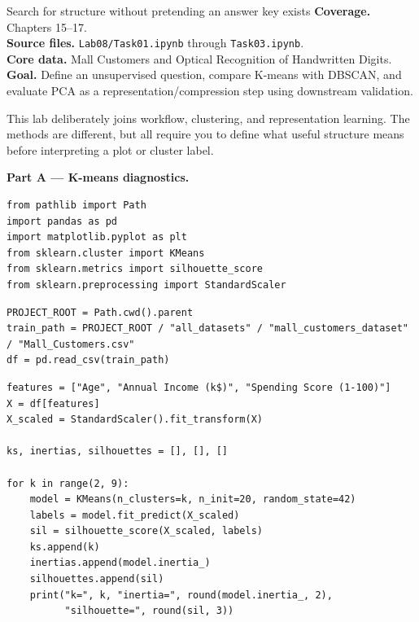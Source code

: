 
\begin{labproject}{Search for structure without pretending an answer key exists}
\textbf{Coverage.} Chapters 15--17.\\
\textbf{Source files.} \texttt{Lab08/Task01.ipynb} through \texttt{Task03.ipynb}.\\
\textbf{Core data.} Mall Customers and Optical Recognition of Handwritten Digits.\\
\textbf{Goal.} Define an unsupervised question, compare K-means with DBSCAN, and evaluate PCA as a representation/compression step using downstream validation.

\begin{labmode}
This lab deliberately joins workflow, clustering, and representation learning. The methods are different, but all require you to define what useful structure means before interpreting a plot or cluster label.
\end{labmode}

\medskip\noindent\textbf{Part A --- K-means diagnostics.}\par
\begin{lstlisting}[style=mlpython]
from pathlib import Path
import pandas as pd
import matplotlib.pyplot as plt
from sklearn.cluster import KMeans
from sklearn.metrics import silhouette_score
from sklearn.preprocessing import StandardScaler
\end{lstlisting}

\begin{lstlisting}[style=mlpython]
PROJECT_ROOT = Path.cwd().parent
train_path = PROJECT_ROOT / "all_datasets" / "mall_customers_dataset" / "Mall_Customers.csv"
df = pd.read_csv(train_path)
\end{lstlisting}

\begin{lstlisting}[style=mlpython]
features = ["Age", "Annual Income (k$)", "Spending Score (1-100)"]
X = df[features]
X_scaled = StandardScaler().fit_transform(X)

ks, inertias, silhouettes = [], [], []

for k in range(2, 9):
    model = KMeans(n_clusters=k, n_init=20, random_state=42)
    labels = model.fit_predict(X_scaled)
    sil = silhouette_score(X_scaled, labels)
    ks.append(k)
    inertias.append(model.inertia_)
    silhouettes.append(sil)
    print("k=", k, "inertia=", round(model.inertia_, 2),
          "silhouette=", round(sil, 3))
\end{lstlisting}


\end{labproject}
